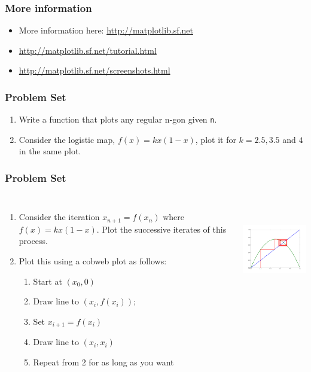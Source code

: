 \documentclass[14pt,compress]{beamer}
\newcounter{time}
\newcommand{\inctime}[1]{\addtocounter{time}{#1}{\tiny \thetime\ m}}
\newcommand{\typ}[1]{\lstinline{#1}}
\begin{document}
\begin{frame}
  \frametitle{More information}
  \begin{itemize}
  \item More information here: \url{http://matplotlib.sf.net}
  \item \url{http://matplotlib.sf.net/tutorial.html}
  \item \url{http://matplotlib.sf.net/screenshots.html}
  \end{itemize}
\end{frame}

\begin{frame}
  \frametitle{Problem Set}
  \begin{enumerate}
      \item Write a function that plots any regular n-gon given \typ{n}.
      \item Consider the logistic map, $f(x) = kx(1-x)$, plot it for
          $k=2.5, 3.5$ and $4$ in the same plot.
\end{enumerate}
\end{frame}

\begin{frame}[fragile] 
\frametitle{Problem Set}
  \begin{columns}
    \small{
    \begin{enumerate}
      \item Consider the iteration $x_{n+1} = f(x_n)$ where $f(x) =
          kx(1-x)$.  Plot the successive iterates of this process.
      \item Plot this using a cobweb plot as follows:
          \begin{enumerate}
              \item Start at $(x_0, 0)$
              \item Draw line to $(x_i, f(x_i))$; 
              \item Set $x_{i+1} = f(x_i)$
              \item Draw line to $(x_i, x_i)$
              \item Repeat from 2 for as long as you want 
          \end{enumerate}
    \end{enumerate}}
    \hspace*{-0.5in}
  \includegraphics[height=1.6in, interpolate=true]{data/cobweb}  
\end{columns}
\inctime{20}
\end{frame}
\end{document}
